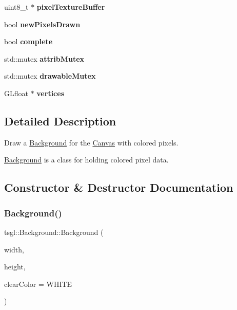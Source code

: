 \begin{DoxyCompactItemize}
uint8\+\_\+t $\ast$ {\bfseries pixel\+Texture\+Buffer}
\item 
\mbox{\label{classtsgl_1_1_background_a75bd96fec33a388120790ac00ce8e45a}} 
bool {\bfseries new\+Pixels\+Drawn}
\item 
\mbox{\label{classtsgl_1_1_background_afc3f38be913b51a8f5045226f6431836}} 
bool {\bfseries complete}
\item 
\mbox{\label{classtsgl_1_1_background_af3e580a9eda76f7322d0cf6919862628}} 
std\+::mutex {\bfseries attrib\+Mutex}
\item 
\mbox{\label{classtsgl_1_1_background_ae3d52b7265f1f06bb8d45357597be02d}} 
std\+::mutex {\bfseries drawable\+Mutex}
\item 
\mbox{\label{classtsgl_1_1_background_add899be17917f5a66479c8c884e73e5a}} 
G\+Lfloat $\ast$ {\bfseries vertices}
\end{DoxyCompactItemize}


\subsection{Detailed Description}
Draw a \hyperlink{classtsgl_1_1_background}{Background} for the \hyperlink{classtsgl_1_1_canvas}{Canvas} with colored pixels. 

\hyperlink{classtsgl_1_1_background}{Background} is a class for holding colored pixel data. 

\subsection{Constructor \& Destructor Documentation}
\mbox{\label{classtsgl_1_1_background_a2cdb442cc62469acc31f6707ba96bea2}} 
\subsubsection{\texorpdfstring{Background()}{Background()}}
{\footnotesize\ttfamily tsgl\+::\+Background\+::\+Background (\begin{DoxyParamCaption}\item[{G\+Lint}]{width,  }\item[{G\+Lint}]{height,  }\item[{const \hyperlink{structtsgl_1_1_color_float}{Color\+Float} \&}]{clear\+Color = {\ttfamily WHITE} }\end{DoxyParamCaption})}



